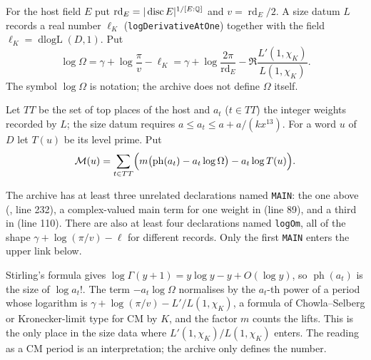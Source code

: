 \begin{definition}\label{geob:logOm}
For the host field $E$ put $\operatorname{rd}_E=|\operatorname{disc}E|^{1/[E:\mathbb{Q}]}$
and $v=\operatorname{rd}_E/2$. A size datum $L$ records a real number
$\ell_K$ (\texttt{logDerivativeAtOne}) together with the field
$\ell_K=\operatorname{dlogL}(D,1)$. Put
\[
\log\Omega=\gamma+\log\frac{\pi}{v}-\ell_K
=\gamma+\log\frac{2\pi}{\operatorname{rd}_E}-\Re\frac{L'(1,\chi_K)}{L(1,\chi_K)}.
\]
The symbol $\log\Omega$ is notation; the archive does not define $\Omega$ itself.
\end{definition}

\begin{definition}\label{geob:main}
Let $TT$ be the set of top places of the host and $a_t$ ($t\in TT$) the integer
weights recorded by $L$; the size datum requires $a\le a_t\le a+a/(kx^{13})$.
For a word $u$ of $D$ let $T(u)$ be its level prime. Put
\[
\mathcal M(u)=\sum_{t\in TT}\Bigl(m\bigl(\operatorname{ph}(a_t)-a_t\log\Omega\bigr)-a_t\log T(u)\Bigr).
\]
\end{definition}

\begin{remark}
The archive has at least three unrelated declarations named \texttt{MAIN}: the
one above (, line 232), a
complex-valued main term for one weight in
 (line 89),
and a third in 
(line 110). There are also at least four declarations named \texttt{logOm},
all of the shape $\gamma+\log(\pi/v)-\ell$ for different records. Only the first
\texttt{MAIN} enters the upper link below.
\end{remark}

\begin{remark}
Stirling's formula gives $\log\Gamma(y+1)=y\log y-y+O(\log y)$, so
$\operatorname{ph}(a_t)$ is the size of $\log a_t!$. The term
$-a_t\log\Omega$ normalises by the $a_t$-th power of a period whose logarithm
is $\gamma+\log(\pi/v)-L'/L(1,\chi_K)$, a formula of Chowla--Selberg or
Kronecker-limit type for CM by $K$, and the factor $m$ counts the lifts. This is
the only place in the size data where $L'(1,\chi_K)/L(1,\chi_K)$ enters. The
reading as a CM period is an interpretation; the archive only defines the
number.
\end{remark}

